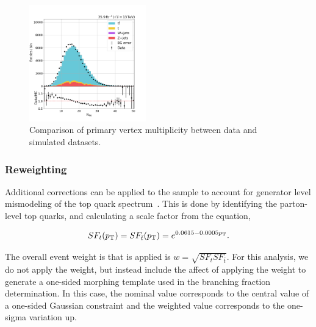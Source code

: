 \begin{figure}[ht]
    \centering
    \includegraphics[width=0.45\textwidth]{chapters/Analysis/sectionDataset/figures/n_pv}
    \caption{Comparison of primary vertex multiplicity between data and simulated datasets.}
    \label{fig:analysis:dataset:npv}
\end{figure}
\FloatBarrier


\subsubsection{\cPqt \pt Reweighting}

Additional corrections can be applied to the \ttbar sample to account for generator level mismodeling of the top quark \pt spectrum~\cite{CMS-PAS-TOP-16-011, CMS-PAS-TOP-16-008}.  This is done by identifying the parton-level top quarks, and calculating a scale factor from the equation,

\begin{equation}
    \nonumber
    SF_{t}(p_{\mathrm{T}}) = SF_{\bar{t}}(p_{\mathrm{T}}) = e^{0.0615-0.0005 p_{\mathrm{T}}}.
\end{equation}


The overall event weight is that is applied is $w = \sqrt{SF_{t}SF_{\bar{t}}}$.  For this analysis, we do not apply the weight, but instead include the affect of applying the weight to generate a one-sided morphing template used in the branching fraction determination.  In this case, the nominal value corresponds to the central value of a one-sided Gaussian constraint and the weighted value corresponds to the one-sigma variation up.

